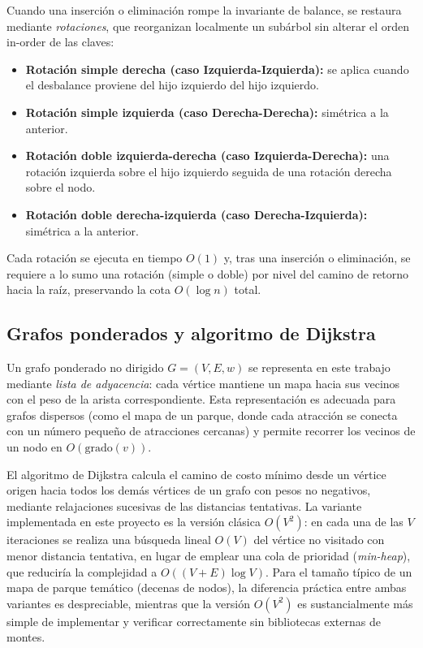 \documentclass[conference]{IEEEtran}
\begin{document}
Cuando una inserci\'on o eliminaci\'on rompe la invariante de balance, se
restaura mediante \emph{rotaciones}, que reorganizan localmente un subárbol
sin alterar el orden in-order de las claves:

\begin{itemize}
  \item \textbf{Rotaci\'on simple derecha (caso Izquierda-Izquierda):} se
    aplica cuando el desbalance proviene del hijo izquierdo del hijo
    izquierdo.
  \item \textbf{Rotaci\'on simple izquierda (caso Derecha-Derecha):} sim\'etrica
    a la anterior.
  \item \textbf{Rotaci\'on doble izquierda-derecha (caso Izquierda-Derecha):}
    una rotaci\'on izquierda sobre el hijo izquierdo seguida de una rotaci\'on
    derecha sobre el nodo.
  \item \textbf{Rotaci\'on doble derecha-izquierda (caso Derecha-Izquierda):}
    sim\'etrica a la anterior.
\end{itemize}

Cada rotaci\'on se ejecuta en tiempo $O(1)$ y, tras una inserci\'on o
eliminaci\'on, se requiere a lo sumo una rotaci\'on (simple o doble) por
nivel del camino de retorno hacia la ra\'iz, preservando la cota $O(\log n)$
total.

\subsection{Grafos ponderados y algoritmo de Dijkstra}

Un grafo ponderado no dirigido $G = (V, E, w)$ se representa en este trabajo
mediante \emph{lista de adyacencia}: cada v\'ertice mantiene un mapa hacia sus
vecinos con el peso de la arista correspondiente. Esta representaci\'on es
adecuada para grafos dispersos (como el mapa de un parque, donde cada
atracci\'on se conecta con un n\'umero peque\~no de atracciones cercanas) y
permite recorrer los vecinos de un nodo en $O(\text{grado}(v))$.

El algoritmo de Dijkstra \cite{dijkstra1959} calcula el camino de costo
m\'inimo desde un v\'ertice origen hacia todos los dem\'as v\'ertices de un
grafo con pesos no negativos, mediante relajaciones sucesivas de las
distancias tentativas. La variante implementada en este proyecto es la
versi\'on cl\'asica $O(V^2)$: en cada una de las $V$ iteraciones se realiza una
b\'usqueda lineal $O(V)$ del v\'ertice no visitado con menor distancia
tentativa, en lugar de emplear una cola de prioridad (\emph{min-heap}), que
reducir\'ia la complejidad a $O((V+E)\log V)$. Para el tama\~no t\'ipico de un
mapa de parque tem\'atico (decenas de nodos), la diferencia pr\'actica entre
ambas variantes es despreciable, mientras que la versi\'on $O(V^2)$ es
sustancialmente m\'as simple de implementar y verificar correctamente sin
bibliotecas externas de montes.
\end{document}
